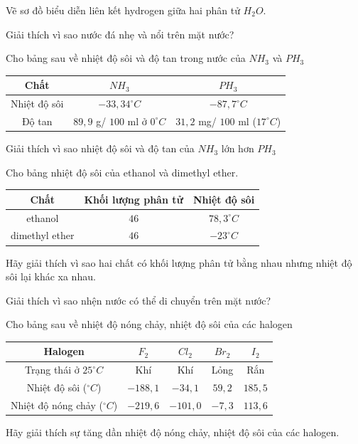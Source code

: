 \begin{bt}
	Vẽ sơ đồ biểu diễn liên kết hydrogen giữa hai phân tử $H_2O$.
	\loigiai{}
\end{bt}
\begin{bt}
	Giải thích vì sao nước đá nhẹ và nổi trên mặt nước?
	\loigiai{}
\end{bt}
\begin{bt}
	Cho bảng sau về nhiệt độ sôi và độ tan trong nước của $NH_3$ và $PH_3$
	\begin{center}
		\begin{tabular}{|c|c|c|}
			\hline
			Chất & $NH_3$ & $PH_3$ \\
			\hline
			Nhiệt độ sôi & $-33{,}34^\circ C$ & $-87{,}7^\circ C$ \\
			\hline
			Độ tan & $89{,}9$ g/ $100$ ml ở $0^\circ C$ & $31{,}2$ mg/ $100$ ml ($17^\circ C$) \\
			\hline
		\end{tabular}
	\end{center}
	Giải thích vì sao nhiệt độ sôi và độ tan của $NH_3$ lớn hơn $PH_3$
	\loigiai{}
\end{bt}
\begin{bt}
	Cho bảng nhiệt độ sôi của ethanol và dimethyl ether.
	\begin{center}
		\begin{tabular}{|c|c|c|}
			\hline
			Chất & Khối lượng phân tử & Nhiệt độ sôi \\
			\hline
			ethanol & $46$ & $78{,}3^\circ C$ \\
			\hline
			dimethyl ether & $46$ & $-23^\circ C$ \\
			\hline
		\end{tabular}
	\end{center}
	Hãy giải thích vì sao hai chất có khối lượng phân tử bằng nhau nhưng nhiệt độ sôi lại khác xa nhau.
	\loigiai{}
\end{bt}
\begin{bt}
	Giải thích vì sao nhện nước có thể di chuyển trên mặt nước?
	\loigiai{}
\end{bt}
\begin{bt}
	Cho bảng sau về nhiệt độ nóng chảy, nhiệt độ sôi của các halogen
	\begin{center}
		\begin{tabular}{|c|c|c|c|c|}
			\hline
			Halogen & $F_2$ & $Cl_2$ & $Br_2$ & $I_2$ \\
			\hline
			Trạng thái ở $25^\circ C$ & Khí & Khí & Lỏng & Rắn \\
			\hline
			Nhiệt độ sôi ($^\circ C$) & $-188{,}1$ & $-34{,}1$ & $59{,}2$ & $185{,}5$ \\
			\hline
			Nhiệt độ nóng chảy ($^\circ C$) & $-219{,}6$ & $-101{,}0$ & $-7{,}3$ & $113{,}6$ \\
			\hline
		\end{tabular}
	\end{center}
	Hãy giải thích sự tăng dần nhiệt độ nóng chảy, nhiệt độ sôi của các halogen.
	\loigiai{}
\end{bt}

